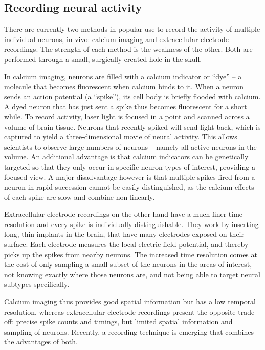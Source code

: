 \subsection{Recording neural activity}

There are currently two methods in popular use to record the activity of multiple individual neurons, in vivo: calcium imaging and extracellular electrode recordings. The strength of each method is the weakness of the other. Both are performed through a small, surgically created hole in the skull.

In calcium imaging, neurons are filled with a calcium indicator or “dye” – a molecule that becomes fluorescent when calcium binds to it. When a neuron sends an action potential (a “spike”), its cell body is briefly flooded with calcium. A dyed neuron that has just sent a spike thus becomes fluorescent for a short while. To record activity, laser light is focused in a point and scanned across a volume of brain tissue. Neurons that recently spiked will send light back, which is captured to yield a three-dimensional movie of neural activity. This allows scientists to observe large numbers of neurons – namely all active neurons in the volume. An additional advantage is that calcium indicators can be genetically targeted so that they only occur in specific neuron types of interest, providing a focused view. A major disadvantage however is that multiple spikes fired from a neuron in rapid succession cannot be easily distinguished, as the calcium effects of each spike are slow and combine non-linearly.

Extracellular electrode recordings on the other hand have a much finer time resolution and every spike is individually distinguishable. They work by inserting long, thin implants in the brain, that have many electrodes exposed on their surface. Each electrode measures the local electric field potential, and thereby picks up the spikes from nearby neurons. The increased time resolution comes at the cost of only sampling a small subset of the neurons in the areas of interest, not knowing exactly where those neurons are, and not being able to target neural subtypes specifically.

Calcium imaging thus provides good spatial information but has a low temporal resolution, whereas extracellular electrode recordings present the opposite trade-off: precise spike counts and timings, but limited spatial information and sampling of neurons. Recently, a recording technique is emerging that combines the advantages of both.


